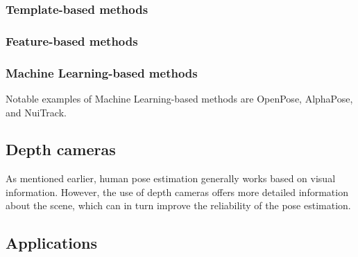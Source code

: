 \subsubsection{Template-based methods}

\subsubsection{Feature-based methods}

\subsubsection{Machine Learning-based methods}

Notable examples of Machine Learning-based methods are OpenPose\cite{openpose}, AlphaPose\cite{alphapose}, and NuiTrack\cite{nuitrack}.

\subsection{Depth cameras}

As mentioned earlier, human pose estimation generally works based on visual information. However, the use of depth cameras offers more detailed information about the scene, which can in turn improve the reliability of the pose estimation.

\subsection{Applications}


